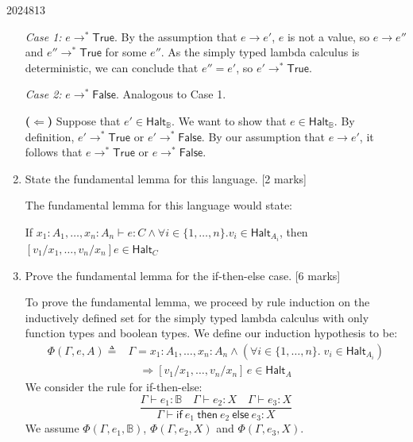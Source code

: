 \documentclass[10pt,\jkfside,a4paper]{article}
\newcommand{\answer}[1]{
    \begin{tcolorbox}[colframe=black, colback=white, sharp corners, boxrule=0.2mm, breakable]
        #1
    \end{tcolorbox}
}
\newcommand{\qmarks}[1]{\hspace*{\fill}[#1]}
\begin{document}
\begin{examquestion}{2024}{8}{13}
\begin{enumerate}
{                \textit{Case 1:} $e \to^* \mathsf{True}$. By the assumption that $e \to e'$, $e$ is not a value, so $e \to e''$ and $e'' \to^* \mathsf{True}$ for some $e''$. As the simply typed lambda calculus is deterministic, we can conclude that $e'' = e'$, so $e' \to^* \mathsf{True}$.

                \textit{Case 2:} $e \to^* \mathsf{False}$. Analogous to Case 1.

                \textbf{($\Leftarrow$)} Suppose that $e' \in \mathsf{Halt}_{\mathbb{B}}$. We want to show that $e \in \mathsf{Halt}_{\mathbb{B}}$.
                By definition, $e' \to^* \mathsf{True}$ or $e' \to^* \mathsf{False}$.
                By our assumption that $e \to e'$, it follows that $e \to^* \mathsf{True}$ or $e \to^* \mathsf{False}$.
            }

        \item
            State the fundamental lemma for this language. \qmarks{2 marks}

            \answer{ 
                The fundamental lemma for this language would state: 

                If $x_1 : A_1, \ldots, x_n : A_n \vdash e : C \wedge \forall i \in \{ 1, \ldots, n \}. v_i \in \mathsf{Halt}_{A_i}$, then $[v_1 / x_1, \ldots, v_n / x_n] e \in \mathsf{Halt}_{C}$
            }

        \item
            Prove the fundamental lemma for the if-then-else case. \qmarks{6 marks}

            \answer{
                To prove the fundamental lemma, we proceed by rule induction on the inductively defined set for the simply typed lambda calculus with only function types and boolean types. We define our induction hypothesis to be:
                \begin{align*}
                    \Phi(\Gamma, e, A) \triangleq{} & \Gamma = x_1 : A_1, \ldots, x_n : A_n \wedge (\forall i \in \{1, \ldots, n\}.\; v_i \in \mathsf{Halt}_{A_i}) \\
                    & \quad \Rightarrow [v_1/x_1, \ldots, v_n/x_n]\,e \in \mathsf{Halt}_A
                \end{align*}
                We consider the rule for if-then-else:
                \[
                    \frac{\Gamma \vdash e_1 : \mathbb{B} \quad \Gamma \vdash e_2 : X \quad \Gamma \vdash e_3 : X}{\Gamma \vdash \mathsf{if}\ e_1\ \mathsf{then}\ e_2\ \mathsf{else}\ e_3 : X}
                \]
                We assume $\Phi(\Gamma, e_1, \mathbb{B})$, $\Phi(\Gamma, e_2, X)$ and $\Phi(\Gamma, e_3, X)$.

}
\end{enumerate}
\end{examquestion}
\end{document}
